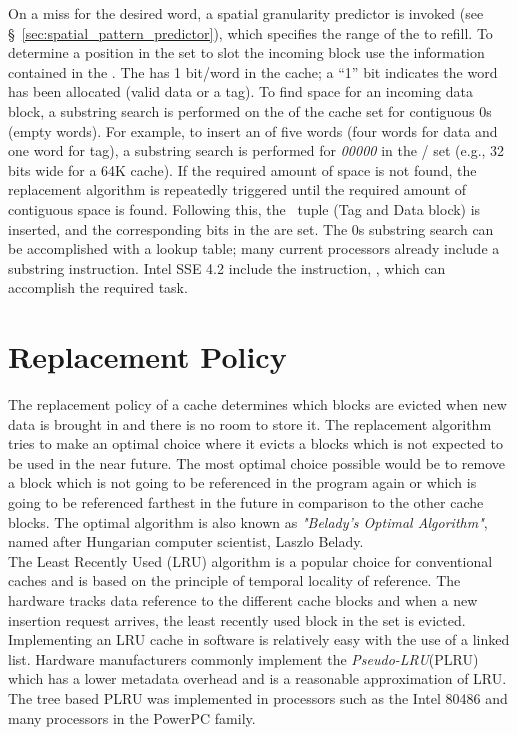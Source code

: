 On a miss for the desired word, a spatial granularity predictor is invoked (see \S~\ref{sec:spatial_pattern_predictor}), which specifies the range of the \AB{} to refill. To determine a position in the set to slot the incoming block use the information contained in the . The  has 1 bit/word in the cache; a ``1'' bit indicates the word has been allocated (valid data or a tag). To find space for an incoming data block, a substring search is performed on the  of the cache set for contiguous 0s (empty words). For example, to insert an \AB{} of five words (four words for data and one word for tag), a substring search is performed for \textit{00000} in the  / set (e.g., 32 bits wide for a 64K cache). If the required amount of space is not found, the replacement algorithm is repeatedly triggered until the required amount of contiguous space is found. Following this, the \AB\ tuple (Tag and Data block) is inserted, and the corresponding bits in the  are set. The 0s substring search can be accomplished with a lookup table; many current processors already include a substring instruction. Intel SSE 4.2 include the instruction, , which can accomplish the required task.

\section{Replacement Policy}

The replacement policy of a cache determines which blocks are evicted when new data is brought in and there is no room to store it. The replacement algorithm tries to make an optimal choice where it evicts a blocks which is not expected to be used in the near future. The most optimal choice possible would be to remove a block which is not going to be referenced in the program again or which is going to be referenced farthest in the future in comparison to the other cache blocks. The optimal algorithm is also known as \textit{"Belady's Optimal Algorithm"}, named after Hungarian computer scientist, Laszlo Belady.
\\

The Least Recently Used (LRU) algorithm is a popular choice for conventional caches and is based on the principle of temporal locality of reference. The hardware tracks data reference to the different cache blocks and when a new insertion request arrives, the least recently used block in the set is evicted. Implementing an LRU cache in software is relatively easy with the use of a linked list. Hardware manufacturers commonly implement the \textit{Pseudo-LRU}(PLRU) which has a lower metadata overhead and is a reasonable approximation of LRU. The tree based PLRU was implemented in processors such as the Intel 80486 and many processors in the PowerPC family. 

